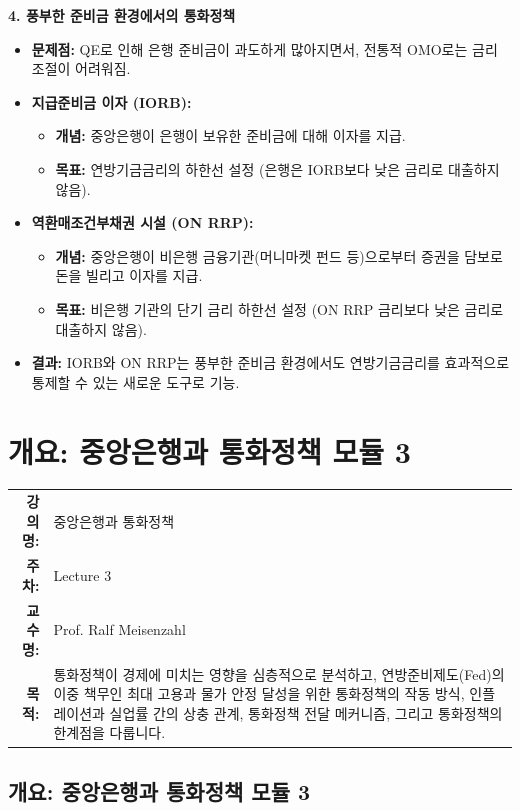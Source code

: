 \documentclass[11pt,a4paper]{book}
\makeatletter
\theoremstyle{definition}
\newcommand{\metainfo}[4]{
\begin{tcolorbox}[
    colback=lightpurple,
    colframe=darkpurple,
    boxrule=1pt,
    arc=2mm,
    left=10pt,
    right=10pt,
    top=8pt,
    bottom=8pt
]
\begin{tabular}{@{}rl@{}}
\textbf{강의명:} & #1 \\[0.3em]
\textbf{주차:} & #2 \\[0.3em]
\textbf{교수명:} & #3 \\[0.3em]
\textbf{목적:} & \begin{minipage}[t]{0.75\textwidth}#4\end{minipage}
\end{tabular}
\end{tcolorbox}
}
\makeatother
\begin{document}
\begin{tcolorbox}[summarybox, title={\textbf{중앙은행 통화정책 도구 요약}}]
  \textbf{4. 풍부한 준비금 환경에서의 통화정책}
  \begin{itemize}
    \item \textbf{문제점:} QE로 인해 은행 준비금이 과도하게 많아지면서, 전통적 OMO로는 금리 조절이 어려워짐.
    \item \textbf{지급준비금 이자 (IORB):}
      \begin{itemize}
        \item \textbf{개념:} 중앙은행이 은행이 보유한 준비금에 대해 이자를 지급.
        \item \textbf{목표:} 연방기금금리의 하한선 설정 (은행은 IORB보다 낮은 금리로 대출하지 않음).
      \end{itemize}
    \item \textbf{역환매조건부채권 시설 (ON RRP):}
      \begin{itemize}
        \item \textbf{개념:} 중앙은행이 비은행 금융기관(머니마켓 펀드 등)으로부터 증권을 담보로 돈을 빌리고 이자를 지급.
        \item \textbf{목표:} 비은행 기관의 단기 금리 하한선 설정 (ON RRP 금리보다 낮은 금리로 대출하지 않음).
      \end{itemize}
    \item \textbf{결과:} IORB와 ON RRP는 풍부한 준비금 환경에서도 연방기금금리를 효과적으로 통제할 수 있는 새로운 도구로 기능.
  \end{itemize}
\end{tcolorbox}


\chapter{개요: 중앙은행과 통화정책 모듈 3}
\label{ch:module7}

\metainfo{중앙은행과 통화정책}{Lecture 3}{Prof. Ralf Meisenzahl}{통화정책이 경제에 미치는 영향을 심층적으로 분석하고, 연방준비제도(Fed)의 이중 책무인 최대 고용과 물가 안정 달성을 위한 통화정책의 작동 방식, 인플레이션과 실업률 간의 상충 관계, 통화정책 전달 메커니즘, 그리고 통화정책의 한계점을 다룹니다.}


\section{개요: 중앙은행과 통화정책 모듈 3}
\end{document}
